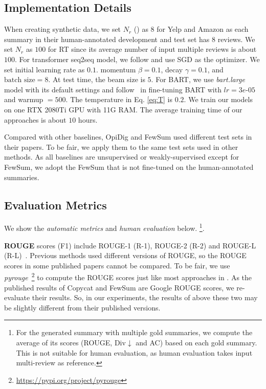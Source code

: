 \subsection{Implementation Details}
When creating synthetic data, 
we set $N_r$ () as $8$ for Yelp and Amazon
as each summary in their human-annotated development and test set has $8$ reviews.
We set $N_r$ as $100$ for RT since its average number of
input multiple reviews is about $100$.
For transformer seq2seq model, we follow \citet{Transformer17} and use SGD as the optimizer.
We set initial learning rate as $0.1$. momentum $\beta=0.1$,  
decay $\gamma=0.1$, and $\text{batch size}=8$. 
At test time, the beam size is $5$.
For BART, we use {\em bart.large} model with its 
default settings and follow~\citet{BART20} in fine-tuning BART with
$lr=3e$-$05$ and warmup $=500$. 
The temperature in Eq. \ref{eq:T} is $0.2$.
We train our models on one RTX 2080Ti GPU with 11G RAM. 
The average training time of our approaches is about $10$ hours.

Compared with other baselines, OpiDig and FewSum used different test sets in their papers.
To be fair, we apply them to the same test sets used in other methods.
As all baselines are unsupervised or weakly-supervised except for FewSum, 
we adopt the FewSum that is not fine-tuned on the human-annotated summaries.


\subsection{Evaluation Metrics}
We show the {\em automatic metrics}
and {\em human evaluation} below.
\footnote{For the generated summary with multiple gold summaries, we compute the average of its scores (ROUGE, Div$\downarrow$ and AC) based on each gold summary. This is not suitable for human evaluation, as human evaluation takes input multi-review as reference.}.


\textbf{ROUGE}
scores (F1) include
ROUGE-1 (R-1), ROUGE-2 (R-2) and
ROUGE-L (R-L)~\cite{rouge}. 
Previous methods used different versions of ROUGE,
so the ROUGE scores in some published papers cannot be compared.
To be fair, we use {\em pyrouge}~\footnote{\url{https://pypi.org/project/pyrouge}} 
to compute the ROUGE scores just like most approaches in .
As the published results of Copycat and FewSum are Google ROUGE scores,
we re-evaluate their results. 
So, in our experiments, the results of above these two may be slightly different from 
their published versions.

